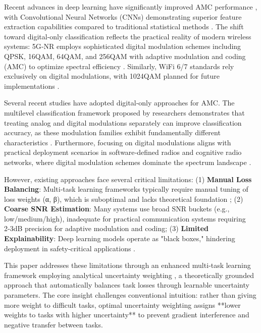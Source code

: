 \documentclass{ELSP}
\begin{document}
Recent advances in deep learning have significantly improved AMC performance \cite{peng2021survey}, with Convolutional Neural Networks (CNNs) demonstrating superior feature extraction capabilities compared to traditional statistical methods \cite{nandi1995cumulants,azzouz1995automatic}. The shift toward digital‑only classification reflects the practical reality of modern wireless systems: 5G‑NR employs sophisticated digital modulation schemes including QPSK, 16QAM, 64QAM, and 256QAM with adaptive modulation and coding (AMC) to optimize spectral efficiency \cite{kong2023transformer}. Similarly, WiFi 6/7 standards rely exclusively on digital modulations, with 1024QAM planned for future implementations \cite{sun2022amc}.

Several recent studies have adopted digital‑only approaches for AMC. The multilevel classification framework proposed by researchers demonstrates that treating analog and digital modulations separately can improve classification accuracy, as these modulation families exhibit fundamentally different characteristics \cite{zheng2023toward}. Furthermore, focusing on digital modulations aligns with practical deployment scenarios in software‑defined radios and cognitive radio networks, where digital modulation schemes dominate the spectrum landscape \cite{o2018over}.

However, existing approaches face several critical limitations: (1) \textbf{Manual Loss Balancing}: Multi‑task learning frameworks typically require manual tuning of loss weights (α, β), which is suboptimal and lacks theoretical foundation \cite{zhang2021survey}; (2) \textbf{Coarse SNR Estimation}: Many systems use broad SNR buckets (e.g., low/medium/high), inadequate for practical communication systems requiring 2‑3dB precision for adaptive modulation and coding; (3) \textbf{Limited Explainability}: Deep learning models operate as "black boxes," hindering deployment in safety‑critical applications \cite{wong2021explainable}.

This paper addresses these limitations through an enhanced multi‑task learning framework employing analytical uncertainty weighting \cite{liu2024analytical}, a theoretically grounded approach that automatically balances task losses through learnable uncertainty parameters. The core insight challenges conventional intuition: rather than giving more weight to difficult tasks, optimal uncertainty weighting \cite{kendall2018multi} assigns **lower weights to tasks with higher uncertainty** to prevent gradient interference and negative transfer between tasks.
\end{document}
